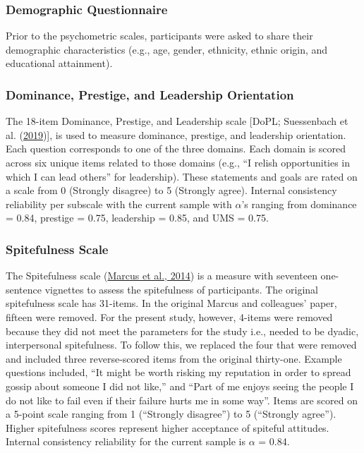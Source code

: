\documentclass[
  donotrepeattitle,doc, 12pt, a4paper,floatsintext]{apa7}
\begin{document}
\hypertarget{demographic-questionnaire}{%
\subsubsection{Demographic Questionnaire}\label{demographic-questionnaire}}

Prior to the psychometric scales, participants were asked to share their demographic characteristics (e.g., age, gender, ethnicity, ethnic origin, and educational attainment).

\hypertarget{dominance-prestige-and-leadership-orientation-1}{%
\subsubsection{Dominance, Prestige, and Leadership Orientation}\label{dominance-prestige-and-leadership-orientation-1}}

The 18-item Dominance, Prestige, and Leadership scale {[}DoPL; Suessenbach et al. (\protect\hyperlink{ref-suessenbach2019}{2019}){]}, is used to measure dominance, prestige, and leadership orientation. Each question corresponds to one of the three domains. Each domain is scored across six unique items related to those domains (e.g., ``I relish opportunities in which I can lead others'' for leadership). These statements and goals are rated on a scale from 0 (Strongly disagree) to 5 (Strongly agree). Internal consistency reliability per subscale with the current sample with \(\alpha\)'s ranging from dominance = 0.84, prestige = 0.75, leadership = 0.85, and UMS = 0.75.

\hypertarget{spitefulness-scale}{%
\subsubsection{Spitefulness Scale}\label{spitefulness-scale}}

The Spitefulness scale (\protect\hyperlink{ref-marcus2014}{Marcus et al., 2014}) is a measure with seventeen one-sentence vignettes to assess the spitefulness of participants. The original spitefulness scale has 31-items. In the original Marcus and colleagues' paper, fifteen were removed. For the present study, however, 4-items were removed because they did not meet the parameters for the study i.e., needed to be dyadic, interpersonal spitefulness. To follow this, we replaced the four that were removed and included three reverse-scored items from the original thirty-one. Example questions included, ``It might be worth risking my reputation in order to spread gossip about someone I did not like,'' and ``Part of me enjoys seeing the people I do not like to fail even if their failure hurts me in some way''. Items are scored on a 5-point scale ranging from 1 (``Strongly disagree'') to 5 (``Strongly agree''). Higher spitefulness scores represent higher acceptance of spiteful attitudes. Internal consistency reliability for the current sample is \(\alpha\) = 0.84.
\end{document}
